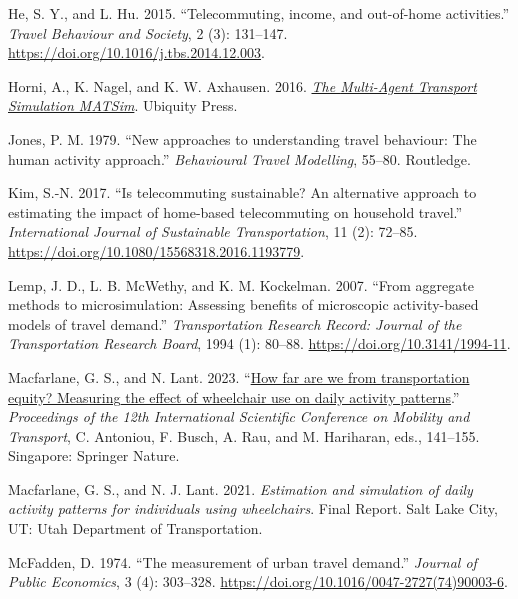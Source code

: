 \documentclass[fancy, oneside, mastersfancy, ms]{byuthesis}
\newlength{\cslhangindent}
\newenvironment{CSLReferences}[2] %
 {\begin{list}{}{%
  \setlength{\itemindent}{0pt}
  \setlength{\leftmargin}{0pt}
  \setlength{\parsep}{0pt}
  \ifodd #1
   \setlength{\leftmargin}{\cslhangindent}
   \setlength{\itemindent}{-1\cslhangindent}
  \fi
  \setlength{\itemsep}{#2\baselineskip}}}
 {\end{list}}
\begin{document}
\begin{CSLReferences}{1}{0}
He, S. Y., and L. Hu. 2015. {``Telecommuting, income, and out-of-home
activities.''} \emph{Travel Behaviour and Society}, 2 (3): 131--147.
\url{https://doi.org/10.1016/j.tbs.2014.12.003}.

Horni, A., K. Nagel, and K. W. Axhausen. 2016.
\emph{\href{https://doi.org/10.5334/baw}{The {Multi-Agent Transport
Simulation MATSim}}}. Ubiquity Press.

Jones, P. M. 1979. {``New approaches to understanding travel behaviour:
The human activity approach.''} \emph{Behavioural {Travel Modelling}},
55--80. Routledge.

Kim, S.-N. 2017. {``Is telecommuting sustainable? {An} alternative
approach to estimating the impact of home-based telecommuting on
household travel.''} \emph{International Journal of Sustainable
Transportation}, 11 (2): 72--85.
\url{https://doi.org/10.1080/15568318.2016.1193779}.

Lemp, J. D., L. B. McWethy, and K. M. Kockelman. 2007. {``From aggregate
methods to microsimulation: Assessing benefits of microscopic
activity-based models of travel demand.''} \emph{Transportation Research
Record: Journal of the Transportation Research Board}, 1994 (1): 80--88.
\url{https://doi.org/10.3141/1994-11}.

Macfarlane, G. S., and N. Lant. 2023.
{``\href{https://doi.org/10.1007/978-981-19-8361-0_10}{How far are we
from transportation equity? {Measuring} the effect of wheelchair use on
daily activity patterns}.''} \emph{Proceedings of the 12th
{International Scientific Conference} on {Mobility} and {Transport}}, C.
Antoniou, F. Busch, A. Rau, and M. Hariharan, eds., 141--155. Singapore:
Springer Nature.

Macfarlane, G. S., and N. J. Lant. 2021. \emph{Estimation and simulation
of daily activity patterns for individuals using wheelchairs}. Final
{Report}. Salt Lake City, UT: Utah Department of Transportation.

McFadden, D. 1974. {``The measurement of urban travel demand.''}
\emph{Journal of Public Economics}, 3 (4): 303--328.
\url{https://doi.org/10.1016/0047-2727(74)90003-6}.


\end{CSLReferences}
\end{document}
